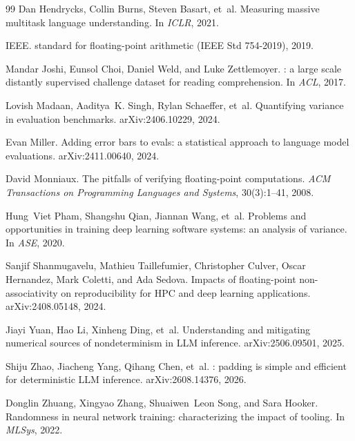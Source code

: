 \begin{thebibliography}{99}
Dan Hendrycks, Collin Burns, Steven Basart, et~al.
\newblock Measuring massive multitask language understanding.
\newblock In \emph{ICLR}, 2021.

IEEE.
 standard for floating-point arithmetic ({IEEE} Std 754-2019), 2019.

Mandar Joshi, Eunsol Choi, Daniel Weld, and Luke Zettlemoyer.
: a large scale distantly supervised challenge dataset for reading
  comprehension.
\newblock In \emph{ACL}, 2017.

Lovish Madaan, Aaditya~K. Singh, Rylan Schaeffer, et~al.
\newblock Quantifying variance in evaluation benchmarks.
\newblock arXiv:2406.10229, 2024.

Evan Miller.
\newblock Adding error bars to evals: a statistical approach to language model evaluations.
\newblock arXiv:2411.00640, 2024.

David Monniaux.
\newblock The pitfalls of verifying floating-point computations.
\newblock \emph{ACM Transactions on Programming Languages and Systems}, 30(3):1--41, 2008.

Hung~Viet Pham, Shangshu Qian, Jiannan Wang, et~al.
\newblock Problems and opportunities in training deep learning software systems: an analysis of
  variance.
\newblock In \emph{ASE}, 2020.

Sanjif Shanmugavelu, Mathieu Taillefumier, Christopher Culver, Oscar Hernandez, Mark Coletti,
  and Ada Sedova.
\newblock Impacts of floating-point non-associativity on reproducibility for {HPC} and deep
  learning applications.
\newblock arXiv:2408.05148, 2024.

Jiayi Yuan, Hao Li, Xinheng Ding, et~al.
\newblock Understanding and mitigating numerical sources of nondeterminism in {LLM} inference.
\newblock arXiv:2506.09501, 2025.

Shiju Zhao, Jiacheng Yang, Qihang Chen, et~al.
: padding is simple and efficient for deterministic {LLM} inference.
\newblock arXiv:2608.14376, 2026.

Donglin Zhuang, Xingyao Zhang, Shuaiwen~Leon Song, and Sara Hooker.
\newblock Randomness in neural network training: characterizing the impact of tooling.
\newblock In \emph{MLSys}, 2022.

\end{thebibliography}
